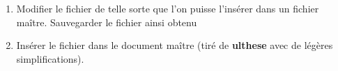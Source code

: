   \begin{exercice}
    \begin{enumerate}
    \item Modifier le fichier  de telle
      sorte que l'on puisse l'insérer dans un fichier maître.
      Sauvegarder le fichier ainsi obtenu 
    \item Insérer le fichier  dans le
      document maître  (tiré de
      \textbf{ulthese} avec de légères simplifications).
    \end{enumerate}
  \end{exercice}


